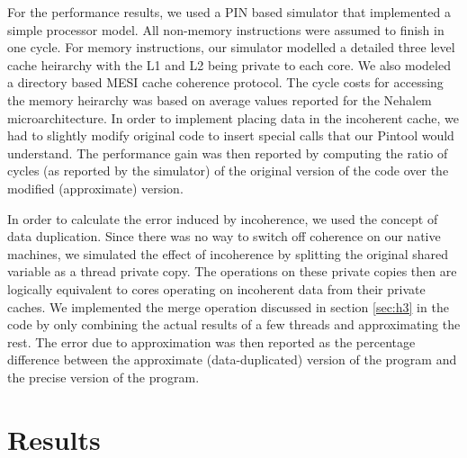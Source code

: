 \documentclass[12pt,conference]{IEEEtran}
\begin{document}

For the performance results, we used a PIN based simulator that
implemented a simple processor model. All non-memory instructions were assumed to
finish in one cycle. For memory instructions, our simulator modelled a detailed
three level cache heirarchy with the L1 and L2 being private to each core. We also 
modeled a directory based MESI cache coherence protocol. The cycle costs for 
accessing the memory heirarchy was based on average values reported for the 
Nehalem microarchitecture. In order to implement placing data in the incoherent cache, 
we had to slightly modify original code to insert special calls that our Pintool would
understand. The performance gain was then reported by computing the ratio of cycles (as
reported by the simulator) of the original version of the code over the modified (approximate) version. 

In order to calculate the error induced by incoherence, we used the concept of 
data duplication. Since there was no way to switch off coherence on our native machines, we
simulated the effect of incoherence by splitting the original shared variable as a thread
private copy. The operations on these private copies then are logically equivalent to cores
operating on incoherent data from their private caches. We implemented the merge operation discussed in 
section \ref{sec:h3} in the code by only combining the actual results of a 
few threads and approximating the rest. The error due to approximation was then 
reported as the percentage difference between the approximate (data-duplicated) version of the 
program and the precise version of the program. 

\section{Results} \label{sec:results}
\end{document}

